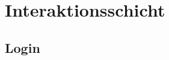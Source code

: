 \documentclass{beamer}
\begin{document}
		\section[Interaktion]{Interaktionsschicht}
		\subsection{Login}
%		
		
\end{document}
